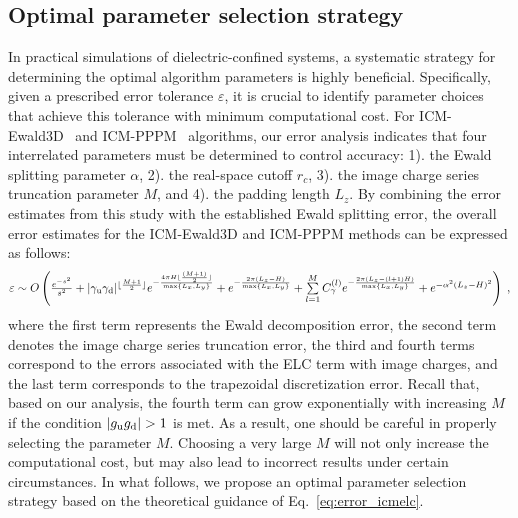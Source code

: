 \subsection{Optimal parameter selection strategy}\label{sec:parameter}
In practical simulations of dielectric-confined systems, a systematic strategy for determining the optimal algorithm parameters is highly beneficial. Specifically, given a prescribed error tolerance $\varepsilon$, it is crucial to identify parameter choices that achieve this tolerance with minimum computational cost. 
For ICM-Ewald3D~\cite{dos2015electrolytes} and ICM-PPPM~\cite{yuan2021particle} algorithms, 
our error analysis indicates that four interrelated parameters must be determined to control accuracy: 1). the Ewald splitting parameter $\alpha$, 2). the real-space cutoff $r_c$, 3). the image charge series truncation parameter $M$, and 4). the padding length $L_z$. 
By combining the error estimates from this study with the established Ewald splitting error, the overall error estimates for the ICM-Ewald3D and ICM-PPPM methods can be expressed as follows:
\begin{equation}\label{eq:error_icmelc}
\resizebox{0.935\width}{!}{\(
\varepsilon \sim O\left(\frac{e^{-s^2}}{s^2}+\abs{\gamma_{\T u} \gamma_{\T d}}^{\lfloor\frac{M+1}{2}\rfloor} e^{-\frac{4\pi H \lfloor\frac{(M+1)}{2}\rfloor}{\max\{L_x,L_y\}}} + e^{-\frac{2\pi(L_z-H)}{\max\{L_x,L_y\}}} + \sum\limits_{l=1}^{M}C_{\gamma}^{(l)}e^{-\frac{2\pi(L_z-(l+1)H)}{\max\{L_x,L_y\}}}+e^{-\alpha^2 (L_z-H)^2}\right)\;,
\)}
\end{equation}
where the first term represents the Ewald decomposition error, the second term denotes the image charge series truncation error, the third and fourth terms correspond to the errors associated with the ELC term with image charges, and the last term corresponds to the trapezoidal discretization error.
Recall that, based on our analysis, the fourth term can grow exponentially with increasing $M$ if the condition $|g_{\text{u}}g_{\text{d}}| > 1$ is met. 
As a result, one should be careful in properly selecting the parameter $M$. 
Choosing a very large $M$ will not only increase the computational cost, but may also lead to incorrect results under certain circumstances.
In what follows, we propose an optimal parameter selection strategy based on the theoretical guidance of Eq.~\eqref{eq:error_icmelc}.

